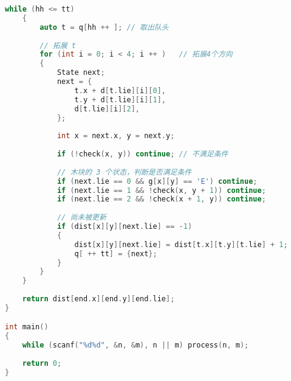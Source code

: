 \begin{lstlisting}[language=cpp]
    while (hh <= tt)
    {
        auto t = q[hh ++ ]; // 取出队头
        
        // 拓展 t
        for (int i = 0; i < 4; i ++ )   // 拓展4个方向
        {
            State next;
            next = {
                t.x + d[t.lie][i][0],
                t.y + d[t.lie][i][1],
                d[t.lie][i][2], 
            };
            
            int x = next.x, y = next.y;
            
            if (!check(x, y)) continue; // 不满足条件
            
            // 木块的 3 个状态，判断是否满足条件
            if (next.lie == 0 && g[x][y] == 'E') continue;  
            if (next.lie == 1 && !check(x, y + 1)) continue;
            if (next.lie == 2 && !check(x + 1, y)) continue;
            
            // 尚未被更新
            if (dist[x][y][next.lie] == -1)
            {
                dist[x][y][next.lie] = dist[t.x][t.y][t.lie] + 1;
                q[ ++ tt] = {next};
            }
        }
    }
    
    return dist[end.x][end.y][end.lie];
}

int main()
{
    while (scanf("%d%d", &n, &m), n || m) process(n, m);
    
    return 0;
}
\end{lstlisting}
